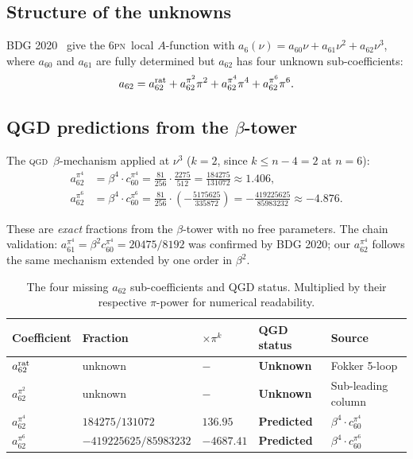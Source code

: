 \documentclass[11pt,a4paper]{article}
\theoremstyle{plain}
\theoremstyle{remark}
\newcommand{\QGD}{\textsc{qgd}}
\newcommand{\PN}{\textsc{pn}}
\begin{document}
\subsection{Structure of the unknowns}

BDG 2020~\cite{BDG2020local} give the 6\PN\ local $A$-function with
$a_6(\nu) = a_{60}\nu + a_{61}\nu^2 + a_{62}\nu^3$,
where $a_{60}$ and $a_{61}$ are fully determined but $a_{62}$ has four
unknown sub-coefficients:
\begin{equation}
  a_{62} = a_{62}^{\rm rat} + a_{62}^{\pi^2}\pi^2
          + a_{62}^{\pi^4}\pi^4 + a_{62}^{\pi^6}\pi^6.
  \label{eq:a62}
\end{equation}

\subsection{QGD predictions from the $\beta$-tower}

The \QGD\ $\beta$-mechanism applied at $\nu^3$ ($k=2$, since $k\leq n-4=2$ at $n=6$):
\begin{align}
  a_{62}^{\pi^4} &= \beta^4\cdot c_{60}^{\pi^4}
    = \frac{81}{256}\cdot\frac{2275}{512}
    = \boxed{\frac{184275}{131072} \approx 1.406},
    \label{eq:a62pi4}\\
  a_{62}^{\pi^6} &= \beta^4\cdot c_{60}^{\pi^6}
    = \frac{81}{256}\cdot\left(-\frac{5175625}{335872}\right)
    = \boxed{-\frac{419225625}{85983232} \approx -4.876}.
    \label{eq:a62pi6}
\end{align}

These are \emph{exact} fractions from the $\beta$-tower with no free parameters.
The chain validation: $a_{61}^{\pi^4} = \beta^2 c_{60}^{\pi^4} = 20475/8192$
was confirmed by BDG 2020; our $a_{62}^{\pi^4}$ follows the same mechanism
extended by one order in $\beta^2$.

\begin{table}[h]
\centering
\caption{The four missing $a_{62}$ sub-coefficients and QGD status.
Multiplied by their respective $\pi$-power for numerical readability.}
\renewcommand{\arraystretch}{1.3}
\begin{tabular}{lllll}
\toprule
Coefficient & Fraction & $\times\pi^k$ & QGD status & Source \\
\midrule
$a_{62}^{\rm rat}$ & unknown & $-$ & \textbf{Unknown} & Fokker 5-loop \\
$a_{62}^{\pi^2}$ & unknown & $-$ & \textbf{Unknown} & Sub-leading column \\
\rowcolor{lightgreen}
$a_{62}^{\pi^4}$ & $184275/131072$ & $136.95$ & \textbf{Predicted} & $\beta^4\!\cdot c_{60}^{\pi^4}$ \\
\rowcolor{lightgreen}
$a_{62}^{\pi^6}$ & $-419225625/85983232$ & $-4687.41$ & \textbf{Predicted} & $\beta^4\!\cdot c_{60}^{\pi^6}$ \\
\bottomrule
\end{tabular}
\end{table}
\end{document}
